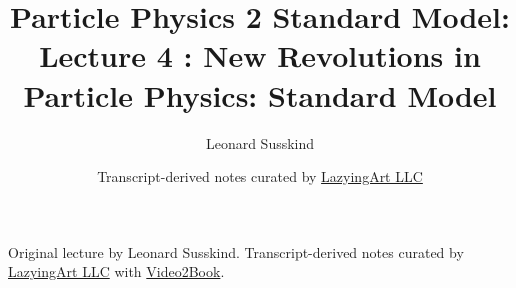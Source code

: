\documentclass[11pt,oneside]{book}
\begin{document}
\frontmatter
\title{Particle Physics 2 Standard Model: Lecture 4 : New Revolutions in Particle Physics: Standard Model}
\author{Leonard Susskind}
\date{Transcript-derived notes curated by \href{https://lazying.art}{LazyingArt LLC}}
\maketitle
\begin{center}
\small Original lecture by Leonard Susskind. Transcript-derived notes curated by \href{https://lazying.art}{LazyingArt LLC} with \href{https://github.com/lachlanchen/Video2Book}{Video2Book}.
\end{center}
\clearpage
\mainmatter

\end{document}
